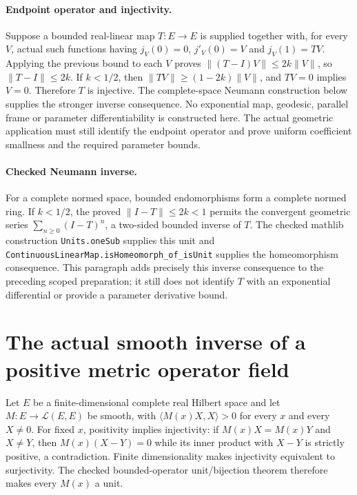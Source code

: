 \documentclass[11pt]{article}
\theoremstyle{definition}
\theoremstyle{remark}
\numberwithin{equation}{section}
\begin{document}
\paragraph{Endpoint operator and injectivity.}
Suppose a bounded real-linear map $T:E\to E$ is supplied together with,
for every $V$, actual such functions having $j_V(0)=0$, $j'_V(0)=V$
and $j_V(1)=TV$. Applying the previous bound to each $V$ proves
$\|(T-I)V\|\le2k\|V\|$, so $\|T-I\|\le2k$.
If $k<1/2$, then $\|TV\|\ge(1-2k)\|V\|$, and $TV=0$ implies
$V=0$. Therefore $T$ is injective. The complete-space Neumann construction below supplies the stronger
inverse consequence. No exponential map, geodesic, parallel
frame or parameter differentiability is constructed here. The actual
geometric application must still identify the endpoint operator and
prove uniform coefficient smallness and the required parameter bounds.

\paragraph{Checked Neumann inverse.}
For a complete normed space, bounded endomorphisms form a complete normed
ring. If $k<1/2$, the proved $\|I-T\|\le2k<1$ permits the convergent
geometric series $\sum_{n\ge0}(I-T)^n$, a two-sided bounded inverse of
$T$. The checked mathlib construction \texttt{Units.oneSub} supplies this
unit and \texttt{ContinuousLinearMap.isHomeomorph\_of\_isUnit} supplies
the homeomorphism consequence. This paragraph adds precisely this inverse
consequence to the preceding scoped preparation; it still does not identify
$T$ with an exponential differential or provide a parameter derivative bound.

\clearpage
\section{The actual smooth inverse of a positive metric operator field}
Let $E$ be a finite-dimensional complete real Hilbert space and let
$M:E\to\mathcal L(E,E)$ be smooth, with
$\langle M(x)X,X\rangle>0$ for every $x$ and every $X\ne0$.
For fixed $x$, positivity implies injectivity: if $M(x)X=M(x)Y$ and
$X\ne Y$, then $M(x)(X-Y)=0$ while its inner product with $X-Y$
is strictly positive, a contradiction. Finite dimensionality makes
injectivity equivalent to surjectivity. The checked bounded-operator
unit/bijection theorem therefore makes every $M(x)$ a unit.
\end{document}
